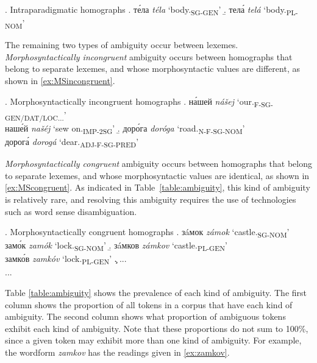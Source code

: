 \documentclass[11pt]{article}
\newcommand{\rus}[1]{\foreignlanguage{russian}{#1}}
\begin{document}
\ex. Intraparadigmatic homographs \label{ex:intrahom}
\a. \rus{т\'{е}ла} \emph{t\'{e}la} `body.\textsubscript{SG-GEN}' 
    \label{ex:bodySGGEN}
\b. \rus{тел\'{а}} \emph{tel\'{a}} `body.\textsubscript{PL-NOM}' 
    \label{ex:bodyPLNOM}

The remaining two types of ambiguity occur between lexemes. 
\emph{Morphosyntactically incongruent} ambiguity occurs between homographs that 
belong to separate lexemes, and whose morphosyntactic values are different, as 
shown in \ref{ex:MSincongruent}.

\ex. Morphosyntactically incongruent homographs \label{ex:MSincongruent}
\a. \rus{н\'{а}шей} \emph{nášej} `our.\textsubscript{F-SG-GEN/DAT/LOC...}'\\
    \rus{наш\'{е}й} \emph{našéj} `sew on.\textsubscript{IMP-2SG}'
\b. \rus{дор\'{о}га} \emph{doróga} `road.\textsubscript{N-F-SG-NOM}'\\
    \rus{дорог\'{а}} \emph{dorogá} `dear.\textsubscript{ADJ-F-SG-PRED}'

\emph{Morphosyntactically congruent} ambiguity occurs between homographs 
that belong to separate lexemes, and whose morphosyntactic values are identical, 
as shown in \ref{ex:MScongruent}. As indicated in Table~\ref{table:ambiguity}, 
this kind of ambiguity is relatively rare, and resolving this ambiguity requires 
the use of technologies such as word sense disambiguation.

\ex. Morphosyntactically congruent homographs \label{ex:MScongruent}
\a. \rus{з\'{a}мок} \emph{z\'{a}mok} `castle.\textsubscript{SG-NOM}'\\
	\rus{зам\'{о}к} \emph{zam\'{o}k} `lock.\textsubscript{SG-NOM}'
\b. \rus{з\'{a}мков} \emph{z\'{a}mkov} `castle.\textsubscript{PL-GEN}'\\
	\rus{замк\'{о}в} \emph{zamk\'{o}v} `lock.\textsubscript{PL-GEN}'
\c. ...\\
	...

Table \ref{table:ambiguity} shows the prevalence of each kind of 
ambiguity. The first column shows the proportion 
of all tokens in a corpus that have each kind of ambiguity. The second column 
shows what proportion of ambiguous tokens exhibit each kind of ambiguity.
Note that these proportions do not sum to 100\%, since a given token may 
exhibit more than one kind of ambiguity. For example, the wordform 
\emph{zamkov} has the readings given in \ref{ex:zamkov}.
\end{document}
